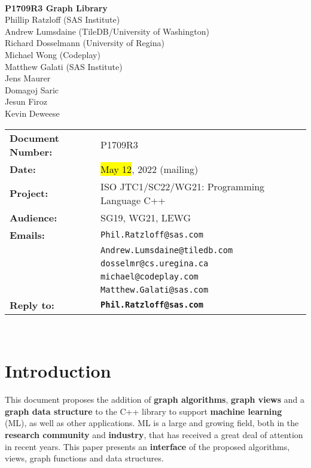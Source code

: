 \documentclass[10pt,onecolumn]{article}
\begin{document}
\begin{titlepage}
~
\vfill
\begin{center}
\LARGE
\textbf{P1709R3 Graph Library}\\
\vspace{12pt}
\normalsize
	Phillip Ratzloff (SAS Institute)\\
	Andrew Lumsdaine (TileDB/University of Washington)\\
	Richard Dosselmann (University of Regina)\\
	Michael Wong (Codeplay)\\
	Matthew Galati (SAS Institute)\\	
	Jens Maurer\\
	Domagoj Saric\\
	Jesun Firoz\\
	Kevin Deweese\\
\end{center}
\vspace{32pt}
\begin{tabular}{ll}
\textbf{Document Number:} & P1709R3\\
\textbf{Date:} & \hl{May 12}, 2022 (mailing)\\ 
\textbf{Project:} & ISO JTC1/SC22/WG21: Programming Language C++\\
\textbf{Audience:} & SG19, WG21, LEWG\\
\textbf{Emails:}
	&\texttt{Phil.Ratzloff@sas.com}\\
	&\texttt{Andrew.Lumsdaine@tiledb.com}\\
	&\texttt{dosselmr@cs.uregina.ca}\\
	&\texttt{michael@codeplay.com}\\
	&\texttt{Matthew.Galati@sas.com}\\
\textbf{Reply to:}
	&\texttt{\textbf{Phil.Ratzloff@sas.com}}\\
\end{tabular}
\vfill
~
\end{titlepage}

\tableofcontents

\clearpage

\section{Introduction}
This document proposes the addition of \textbf{graph algorithms}, \textbf{graph views} and a \textbf{graph data structure} to the C++ library to support \textbf{machine learning} (ML), as well as other applications. ML is a large and growing field, both in the \textbf{research community} and \textbf{industry}, that has received a great deal of attention in recent years. This paper presents an \textbf{interface} of the proposed algorithms, views, graph functions and data structures.
\end{document}

